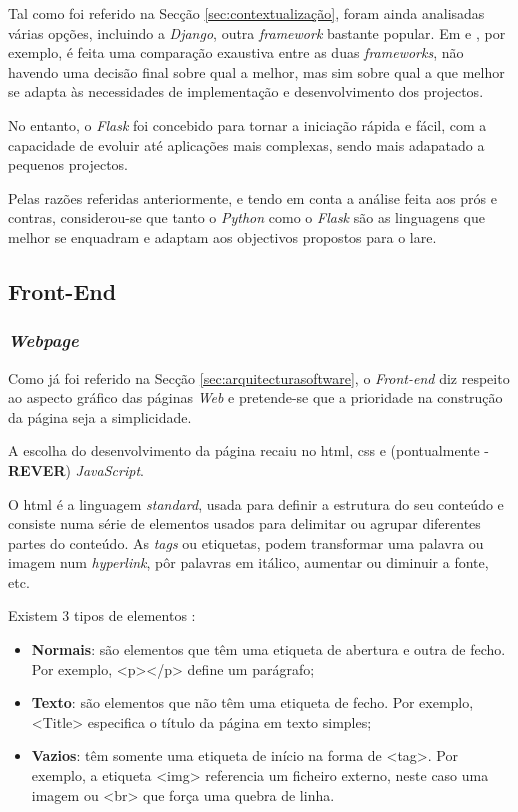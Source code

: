Tal como foi referido na Secção \ref{sec:contextualização}, foram ainda analisadas várias opções, incluindo a \textit{Django}, outra \textit{framework} bastante popular. Em \cite{Djangovsflask} e \cite{FlaskvsDjango}, por exemplo, é feita uma comparação exaustiva entre as duas \textit{frameworks}, não havendo uma decisão final sobre qual a melhor, mas sim sobre qual a que melhor se adapta às necessidades de implementação e desenvolvimento dos projectos.

No entanto, o \textit{Flask} foi concebido para tornar a iniciação rápida e fácil, com a capacidade de evoluir até aplicações mais complexas, sendo mais adapatado a pequenos projectos.

Pelas razões referidas anteriormente, e tendo em conta a análise feita aos prós e contras, considerou-se que tanto o \textit{Python} como o \textit{Flask} são as linguagens que melhor se enquadram e adaptam aos objectivos propostos para o \acrshort{lare}.

\subsection{Front-End}
\label{sec:frontend}
\subsubsection{\textit{Webpage}}
Como já foi referido na Secção \ref{sec:arquitecturasoftware}, o \textit{Front-end} diz respeito ao aspecto gráfico das páginas \textit{Web} e pretende-se que a prioridade na construção da página seja a simplicidade.

A escolha do desenvolvimento da página recaiu no \acrshort{html}, \acrshort{css} e (pontualmente - \textbf{REVER}) \textit{JavaScript}.

O \acrshort{html} é a linguagem \textit{standard}, usada para definir a estrutura do seu conteúdo e consiste numa série de elementos usados para delimitar ou agrupar diferentes partes do conteúdo. As \textit{tags} ou etiquetas, podem transformar uma palavra ou imagem num \textit{hyperlink}, pôr palavras em itálico, aumentar ou diminuir a fonte, etc. \cite{HTMLbasics}

Existem 3 tipos de elementos \cite{HTMLwikipedia}:
\begin{itemize}
    \item \textbf{Normais}: são elementos que têm uma etiqueta de abertura e outra de fecho. Por exemplo, <p></p> define um parágrafo;
    \item \textbf{Texto}: são elementos que não têm uma etiqueta de fecho. Por exemplo, <Title> especifica o título da página em texto simples;
    \item \textbf{Vazios}: têm somente uma etiqueta de início na forma de <tag>. Por exemplo, a etiqueta <img> referencia um ficheiro externo, neste caso uma imagem ou <br> que força uma quebra de linha.
\end{itemize}

